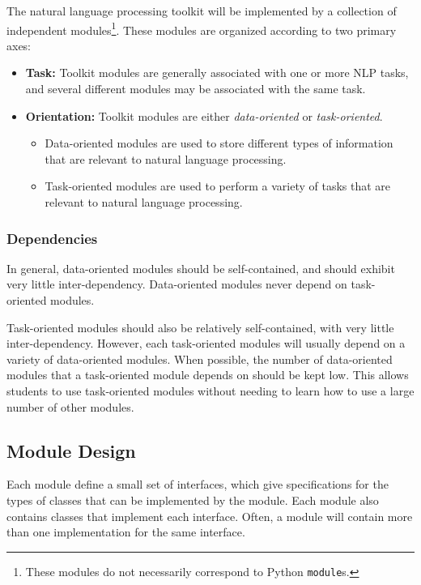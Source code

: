 \documentclass{article}
\begin{document}
The natural language processing toolkit will be implemented by a
collection of independent modules\footnote{These modules do not
necessarily correspond to Python \texttt{module}s.}.  These modules are
organized according to two primary axes:

\begin{itemize}
  \item \textbf{Task:} Toolkit modules are generally associated with
  one or more NLP tasks, and several different modules may be
  associated with the same task.

  \item \textbf{Orientation:} Toolkit modules are either
  \emph{data-oriented} or \emph{task-oriented}.

  \begin{itemize}
    \item Data-oriented modules are used to store different types of
    information that are relevant to natural language processing.
    \item Task-oriented modules are used to perform a variety of tasks 
    that are relevant to natural language processing.
  \end{itemize}
\end{itemize}

\subsubsection{Dependencies}

In general, data-oriented modules should be self-contained, and should
exhibit very little inter-dependency.  Data-oriented modules never
depend on task-oriented modules.

Task-oriented modules should also be relatively self-contained, with
very little inter-dependency.  However, each task-oriented modules
will usually depend on a variety of data-oriented modules.  When
possible, the number of data-oriented modules that a task-oriented
module depends on should be kept low.  This allows students to use
task-oriented modules without needing to learn how to use a large
number of other modules.

\subsection{Module Design}

Each module define a small set of interfaces, which give
specifications for the types of classes that can be implemented by the
module.  Each module also contains classes that implement each
interface.  Often, a module will contain more than one implementation
for the same interface.
\end{document}

